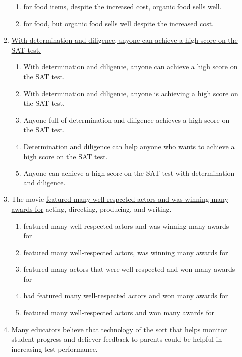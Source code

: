 \begin{enumerate}
\begin{enumerate}[label=(\Alph*)]
\begin{enumerate}[label=(\Alph*)]
\item for food items, despite the increased cost, organic food sells well. \hrulefill
 
\item for food, but organic food sells well despite the increased cost. \hrulefill

\end{enumerate}

\bigskip
\item \ul{With determination and diligence, anyone can achieve a high score on the SAT test.}

\bigskip
\begin{enumerate}[label=(\Alph*)]

\item With determination and diligence, anyone can achieve a high score on the SAT test. \hrulefill
\item With determination and diligence, anyone is achieving a high score on the SAT test.\hrulefill
\item Anyone full of determination and diligence achieves a high score on the SAT test.\hrulefill
\item Determination and diligence can help anyone who wants to achieve a high score on the SAT test. \hrulefill
\item Anyone can achieve a high score on the SAT test with determination and diligence.\hrulefill
\end{enumerate}

\bigskip
\item The movie \ul{featured many well-respected actors and was winning many awards for} acting, directing, producing, and writing. 

\bigskip
\begin{enumerate}[label=(\Alph*)]
\item featured many well-respected actors and was winning many awards for \hrulefill
\item featured many well-respected actors, was winning many awards for\hrulefill
\item featured many actors that were well-respected and won many awards for \hrulefill
\item had featured many well-respected actors and won many awards for\hrulefill
\item featured many well-respected actors and won many awards for \hrulefill
\end{enumerate}

\bigskip
\item \ul{Many educators believe that technology of the sort that} helps monitor student progress and deliever feedback to parents could be helpful in increasing test performance. 


\end{enumerate}
\end{enumerate}
